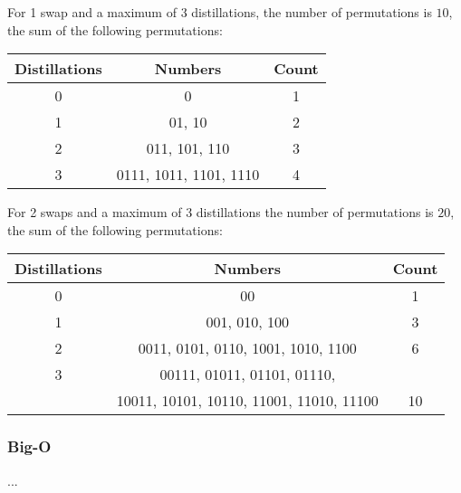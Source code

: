 \documentclass{article}
\begin{document}
For 1 swap and a maximum of 3 distillations, the number of permutations is $10$, the sum of the following permutations:
\\
\begin{center}
\begin{tabular}{|c|c|c|}
\hline
Distillations & Numbers                      & Count \\
\hline
0             & 0                            & 1     \\
\hline
1             & 01, 10                       & 2     \\
\hline
2             & 011, 101, 110                & 3     \\
\hline
3             & 0111, 1011, 1101, 1110       & 4     \\
\hline
\end{tabular}
\end{center}

For 2 swaps and a maximum of 3 distillations the number of permutations is $20$, the sum of the following permutations:
\\
\begin{center}
\begin{tabular}{|c|c|c|}
\hline
Distillations & Numbers                                    & Count \\
\hline
0             & 00                                         & 1     \\
\hline
1             & 001, 010, 100                              & 3     \\
\hline
2             & 0011, 0101, 0110, 1001, 1010, 1100         & 6     \\
\hline
3             & 00111, 01011, 01101, 01110,                &       \\
              & 10011, 10101, 10110, 11001, 11010, 11100   & 10    \\
\hline
\end{tabular}
\end{center}

\subsubsection*{Big-O}

...
\end{document}
